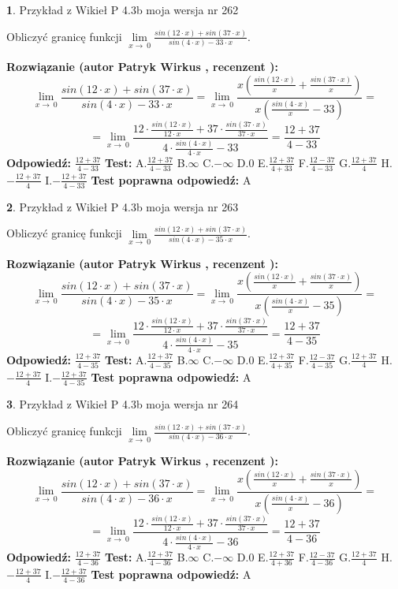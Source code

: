 \documentclass[12pt, a4paper]{article}
\theoremstyle{definition} %
\newtheorem{zad}{}
\newcommand{\zadStart}[1]{\begin{zad}#1\newline}
\newcommand{\zadStop}{\end{zad}}
\newcommand{\rozwStart}[2]{\noindent \textbf{Rozwiązanie (autor #1 , recenzent #2): }\newline}
\newcommand{\rozwStop}{\newline}
\newcommand{\odpStart}{\noindent \textbf{Odpowiedź:}\newline}
\newcommand{\odpStop}{\newline}
\newcommand{\testStart}{\noindent \textbf{Test:}\newline}
\newcommand{\testStop}{\newline}
\newcommand{\kluczStart}{\noindent \textbf{Test poprawna odpowiedź:}\newline}
\newcommand{\kluczStop}{\newline}
\begin{document}
\zadStart{Przykład z Wikieł P 4.3b moja wersja nr 262}


Obliczyć granicę funkcji $\lim\limits_{x\to\ 0}\frac{sin(12 \cdot x)+sin(37 \cdot x)}{sin(4 \cdot x)-33 \cdot x}$.
\zadStop
\rozwStart{Patryk Wirkus}{}
$$\lim\limits_{x\to\ 0}\frac{sin(12 \cdot x)+sin(37 \cdot x)}{sin(4 \cdot x)-33 \cdot x}=\lim\limits_{x\to\ 0}\frac{x(\frac{sin(12 \cdot x)}{x}+\frac{sin(37 \cdot x)}{x})}{x(\frac{sin(4 \cdot x)}{x}-33)}=$$
$$=\lim\limits_{x\to\ 0}\frac{12 \cdot \frac{sin(12 \cdot x)}{12 \cdot x}+37 \cdot \frac{sin(37 \cdot x)}{37 \cdot x}}{4 \cdot \frac{sin(4 \cdot x)}{4 \cdot x}-33}=\frac{12+37}{4-33}$$
\rozwStop
\odpStart
$\frac{12+37}{4-33}$
\odpStop
\testStart
A.$\frac{12+37}{4-33}$
B.$\infty$
C.$-\infty$
D.$0$
E.$\frac{12+37}{4+33}$
F.$\frac{12-37}{4-33}$
G.$\frac{12+37}{4}$
H.$-\frac{12+37}{4}$
I.$-\frac{12+37}{4-33}$
\testStop
\kluczStart
A
\kluczStop



\zadStart{Przykład z Wikieł P 4.3b moja wersja nr 263}


Obliczyć granicę funkcji $\lim\limits_{x\to\ 0}\frac{sin(12 \cdot x)+sin(37 \cdot x)}{sin(4 \cdot x)-35 \cdot x}$.
\zadStop
\rozwStart{Patryk Wirkus}{}
$$\lim\limits_{x\to\ 0}\frac{sin(12 \cdot x)+sin(37 \cdot x)}{sin(4 \cdot x)-35 \cdot x}=\lim\limits_{x\to\ 0}\frac{x(\frac{sin(12 \cdot x)}{x}+\frac{sin(37 \cdot x)}{x})}{x(\frac{sin(4 \cdot x)}{x}-35)}=$$
$$=\lim\limits_{x\to\ 0}\frac{12 \cdot \frac{sin(12 \cdot x)}{12 \cdot x}+37 \cdot \frac{sin(37 \cdot x)}{37 \cdot x}}{4 \cdot \frac{sin(4 \cdot x)}{4 \cdot x}-35}=\frac{12+37}{4-35}$$
\rozwStop
\odpStart
$\frac{12+37}{4-35}$
\odpStop
\testStart
A.$\frac{12+37}{4-35}$
B.$\infty$
C.$-\infty$
D.$0$
E.$\frac{12+37}{4+35}$
F.$\frac{12-37}{4-35}$
G.$\frac{12+37}{4}$
H.$-\frac{12+37}{4}$
I.$-\frac{12+37}{4-35}$
\testStop
\kluczStart
A
\kluczStop



\zadStart{Przykład z Wikieł P 4.3b moja wersja nr 264}


Obliczyć granicę funkcji $\lim\limits_{x\to\ 0}\frac{sin(12 \cdot x)+sin(37 \cdot x)}{sin(4 \cdot x)-36 \cdot x}$.
\zadStop
\rozwStart{Patryk Wirkus}{}
$$\lim\limits_{x\to\ 0}\frac{sin(12 \cdot x)+sin(37 \cdot x)}{sin(4 \cdot x)-36 \cdot x}=\lim\limits_{x\to\ 0}\frac{x(\frac{sin(12 \cdot x)}{x}+\frac{sin(37 \cdot x)}{x})}{x(\frac{sin(4 \cdot x)}{x}-36)}=$$
$$=\lim\limits_{x\to\ 0}\frac{12 \cdot \frac{sin(12 \cdot x)}{12 \cdot x}+37 \cdot \frac{sin(37 \cdot x)}{37 \cdot x}}{4 \cdot \frac{sin(4 \cdot x)}{4 \cdot x}-36}=\frac{12+37}{4-36}$$
\rozwStop
\odpStart
$\frac{12+37}{4-36}$
\odpStop
\testStart
A.$\frac{12+37}{4-36}$
B.$\infty$
C.$-\infty$
D.$0$
E.$\frac{12+37}{4+36}$
F.$\frac{12-37}{4-36}$
G.$\frac{12+37}{4}$
H.$-\frac{12+37}{4}$
I.$-\frac{12+37}{4-36}$
\testStop
\kluczStart
A
\kluczStop
\end{document}
